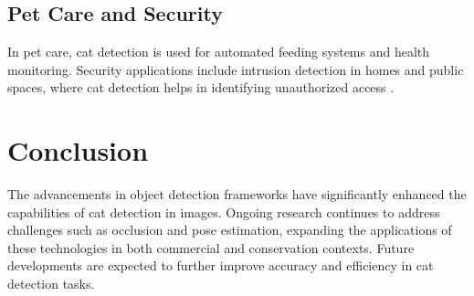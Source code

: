 \documentclass{article}
\begin{document}
\subsection{Pet Care and Security}
In pet care, cat detection is used for automated feeding systems and health monitoring. Security applications include intrusion detection in homes and public spaces, where cat detection helps in identifying unauthorized access \cite{pet_security}.

\section{Conclusion}
The advancements in object detection frameworks have significantly enhanced the capabilities of cat detection in images. Ongoing research continues to address challenges such as occlusion and pose estimation, expanding the applications of these technologies in both commercial and conservation contexts. Future developments are expected to further improve accuracy and efficiency in cat detection tasks.



\end{document}

